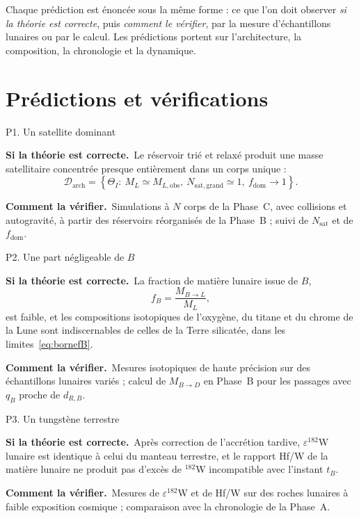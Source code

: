 \documentclass[11pt,a4paper,openany]{report}
\newcommand{\sila}{\par\noindent\textbf{Si la théorie est correcte.}\ }
\newcommand{\verif}{\par\smallskip\noindent\textbf{Comment la vérifier.}\ }
\begin{document}
\noindent
Chaque prédiction est énoncée sous la même forme : ce que l'on doit observer \emph{si la théorie
est correcte}, puis \emph{comment le vérifier}, par la mesure d'échantillons lunaires ou par le
calcul. Les prédictions portent sur l'architecture, la composition, la chronologie et la dynamique.

\chapter{Prédictions et vérifications}
\label{ch:predictions}
\label{sec:signatures}

\begin{prediction}{P1. Un satellite dominant}
\sila Le réservoir trié et relaxé produit une masse satellitaire concentrée presque entièrement
dans un corps unique :
\begin{equation}
\mathcal{D}_{\mathrm{arch}}=\left\{\Theta_I:\ M_L\simeq M_{L,\mathrm{obs}},\
N_{\mathrm{sat,grand}}\simeq1,\ f_{\mathrm{dom}}\to1\right\}.
\label{eq:Darch}
\end{equation}
\verif Simulations à $N$ corps de la Phase~C, avec collisions et autogravité, à partir des
réservoirs réorganisés de la Phase~B ; suivi de $N_{\mathrm{sat}}$ et de $f_{\mathrm{dom}}$.
\end{prediction}

\begin{prediction}{P2. Une part négligeable de $B$}
\sila La fraction de matière lunaire issue de $B$,
\begin{equation}
f_B=\frac{M_{B\to L}}{M_L},
\label{eq:fB}
\end{equation}
est faible, et les compositions isotopiques de l'oxygène, du titane et du chrome de la Lune sont
indiscernables de celles de la Terre silicatée, dans les limites~\eqref{eq:bornefB}.
\verif Mesures isotopiques de haute précision sur des échantillons lunaires variés ; calcul de
$M_{B\to D}$ en Phase~B pour les passages avec $q_B$ proche de $d_{R,B}$.
\end{prediction}

\begin{prediction}{P3. Un tungstène terrestre}
\sila Après correction de l'accrétion tardive, $\varepsilon^{182}$W lunaire est identique à celui du
manteau terrestre, et le rapport Hf/W de la matière lunaire ne produit pas d'excès de $^{182}$W
incompatible avec l'instant $t_B$.
\verif Mesures de $\varepsilon^{182}$W et de Hf/W sur des roches lunaires à faible exposition
cosmique ; comparaison avec la chronologie de la Phase~A.
\end{prediction}
\end{document}
